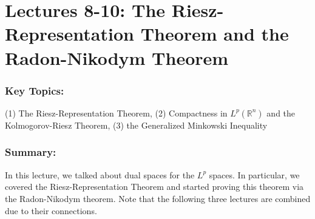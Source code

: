 \documentclass{article}
\begin{document}
\section{Lectures 8-10: The Riesz-Representation Theorem and the Radon-Nikodym Theorem}
\subsubsection{Key Topics:} (1) The Riesz-Representation Theorem, (2) Compactness in $L^{p}(\mathbb{R}^{n})$ and the Kolmogorov-Riesz Theorem, (3) the Generalized Minkowski Inequality
\subsubsection{Summary:} In this lecture, we talked about dual spaces for the $L^{p}$ spaces. In particular, we covered the Riesz-Representation Theorem and started proving this theorem via the Radon-Nikodym theorem. Note that the following three lectures are combined due to their connections. 
\end{document}
